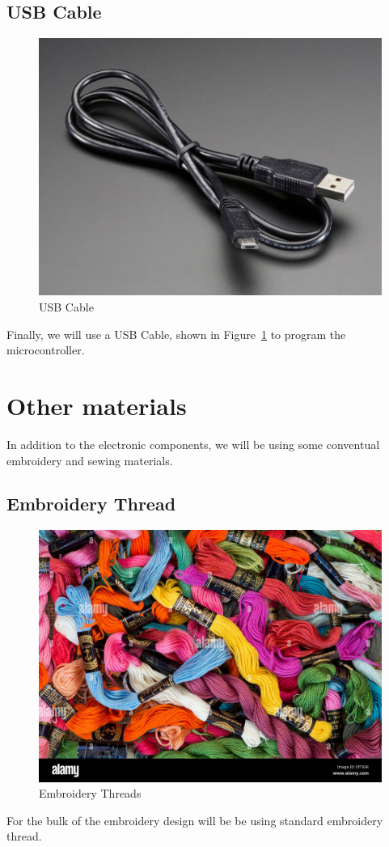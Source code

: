 \documentclass[letterpaper,twoside,12pt]{article}
\begin{document}
\subsection{USB Cable}
\begin{figure}[hbpt]\begin{centering}%
\includegraphics[width=5in]{USBCable.jpg}
\caption{USB Cable}
\label{fig:usbcable}
\end{centering}\end{figure}
Finally, we will use a USB Cable, shown in Figure~\ref{fig:usbcable} to 
program the microcontroller.
\section{Other materials}
In addition to the electronic components, we will be using some conventual 
embroidery and sewing materials.
\clearpage
\subsection{Embroidery Thread}
\begin{figure}[hbpt]\begin{centering}%
\includegraphics[width=5in]{embroiderythreads.jpg}
\caption{Embroidery Threads}
\label{fig:embroiderythreads}
\end{centering}\end{figure}
For the bulk of the embroidery design will be be using standard embroidery 
thread.
\clearpage
\end{document}
